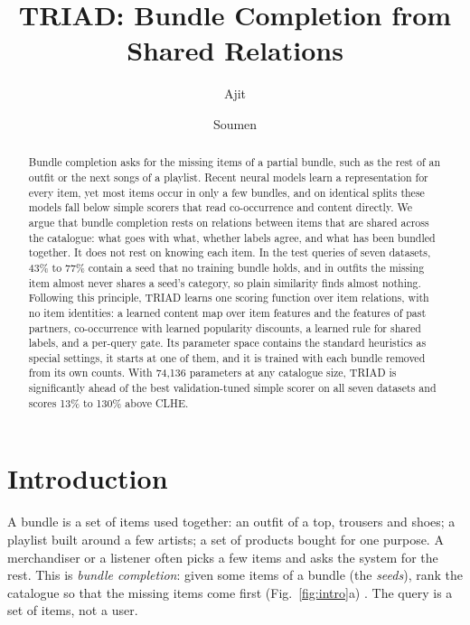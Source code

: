 \documentclass[runningheads]{llncs}
\begin{document}
\title{TRIAD: Bundle Completion from Shared Relations}
\author{Ajit \and Soumen}
\institute{}
\maketitle

\begin{abstract}
Bundle completion asks for the missing items of a partial bundle, such as the rest of an outfit or the next songs of
a playlist. Recent neural models learn a representation for every item, yet most items occur in only a few bundles,
and on identical splits these models fall below simple scorers that read co-occurrence and content directly. We argue
that bundle completion rests on relations between items that are shared across the catalogue: what goes with what,
whether labels agree, and what has been bundled together. It does not rest on knowing each item. In the test
queries of seven datasets, 43\% to 77\% contain a seed that no training bundle holds, and in outfits the missing item
almost never shares a seed's category, so plain similarity finds almost nothing. Following this principle, TRIAD learns one scoring
function over item relations, with no item identities: a learned content map over item features and the
features of past partners, co-occurrence with learned popularity discounts, a learned rule for shared labels, and a
per-query gate. Its parameter space contains the standard heuristics as special settings, it starts at one of them,
and it is trained with each bundle removed from its own counts. With 74,136 parameters at any catalogue size, TRIAD
is significantly ahead of the best validation-tuned simple scorer on all seven datasets and scores 13\% to 130\%
above CLHE.
\end{abstract}

\section{Introduction}
\label{sec:intro}

A bundle is a set of items used together: an outfit of a top, trousers and shoes; a playlist built around a few
artists; a set of products bought for one purpose. A merchandiser or a listener often picks a few items and asks the
system for the rest. This is \emph{bundle completion}: given some items of a bundle (the \emph{seeds}), rank the
catalogue so that the missing items come first (Fig.~\ref{fig:intro}a) \cite{clhe,ramen}. The query is a set of
items, not a user.
\end{document}
